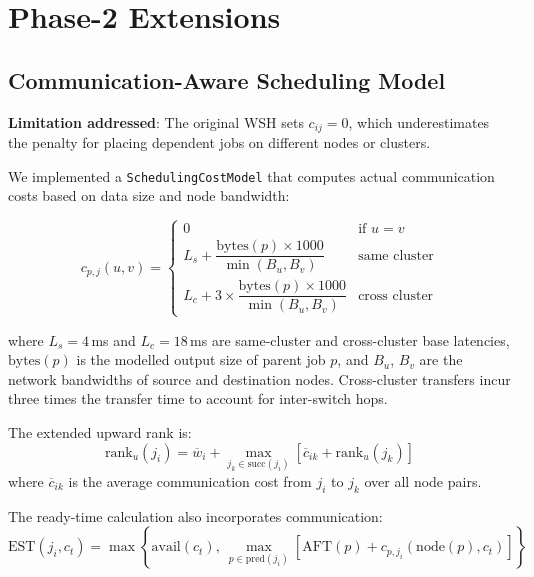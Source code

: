 \documentclass[12pt,a4paper]{article}
\begin{document}
\section{Phase-2 Extensions}
\label{sec:extensions}

\subsection{Communication-Aware Scheduling Model}
\label{sec:comm_model}

\textbf{Limitation addressed}: The original WSH sets $c_{ij} = 0$, which underestimates the penalty for placing dependent jobs on different nodes or clusters.

We implemented a \texttt{SchedulingCostModel} that computes actual communication costs based on data size and node bandwidth:

\begin{equation}
    c_{p,j}(u, v) = \begin{cases}
        0 & \text{if } u = v \\
        L_s + \dfrac{\text{bytes}(p) \times 1000}{\min(B_u, B_v)} & \text{same cluster} \\
        L_c + 3 \times \dfrac{\text{bytes}(p) \times 1000}{\min(B_u, B_v)} & \text{cross cluster}
    \end{cases}
    \label{eq:comm_cost}
\end{equation}

where $L_s = 4$\,ms and $L_c = 18$\,ms are same-cluster and cross-cluster base latencies, $\text{bytes}(p)$ is the modelled output size of parent job $p$, and $B_u$, $B_v$ are the network bandwidths of source and destination nodes. Cross-cluster transfers incur three times the transfer time to account for inter-switch hops.

The extended upward rank is:
\begin{equation}
    \text{rank}_u(j_i) = \overline{w}_i + \max_{j_k \in \text{succ}(j_i)} \left[ \overline{c}_{ik} + \text{rank}_u(j_k) \right]
    \label{eq:comm_rank}
\end{equation}
where $\overline{c}_{ik}$ is the average communication cost from $j_i$ to $j_k$ over all node pairs.

The ready-time calculation also incorporates communication:
\begin{equation}
    \text{EST}(j_i, c_t) = \max \left\{ \text{avail}(c_t),\ \max_{p \in \text{pred}(j_i)} \left[ \text{AFT}(p) + c_{p,j_i}(\text{node}(p), c_t) \right] \right\}
    \label{eq:comm_est}
\end{equation}
\end{document}
